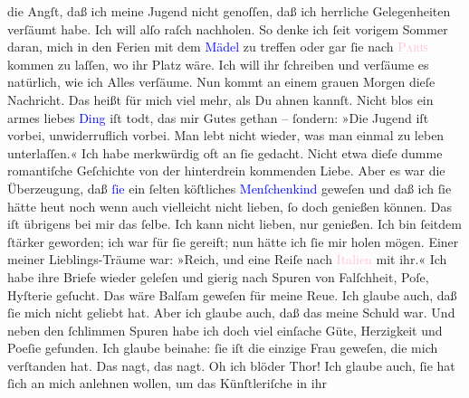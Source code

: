                die Angſt, daß ich \strikeout{\textcolor{gray}{d}} meine Jugend nicht genoſſen, daß ich herrliche Gelegenheiten verſäumt habe.
               Ich will alſo raſch nachholen. So denke ich ſeit vorigem Sommer daran, mich in den
               Ferien {\pb}mit dem \textcolor{blue}{Mädel}{} zu treffen oder gar ſie nach \textsc{\textcolor{pink}{Paris}{}\ledrightnote{\textcolor{pink}{Paris}}} kommen zu laſſen, wo ihr Platz wäre. Ich will ihr ſchreiben und verſäume es
               natürlich, wie ich Alles verſäume. Nun kommt an einem grauen Morgen dieſe Nachricht.
               Das heißt für mich viel mehr, als Du ahnen kannſt. Nicht blos ein armes liebes \textcolor{blue}{Ding}{} iſt todt, das mir Gutes
               gethan – ſondern: »Die Jugend iſt vorbei, unwiderruflich vorbei. Man lebt nicht
               wieder, was man einmal zu leben unterlaſſen.«\pend
           \pstart
           Ich habe merkwürdig oft an ſie gedacht. Nicht etwa dieſe dumme romantiſche Geſchichte
               von der hinterdrein kommenden Liebe. Aber  es war
               die Überzeugung, daß \textcolor{blue}{ſie}{} ein
               ſelten köſtliches \textcolor{blue}{Menſchenkind}{} geweſen {\pb}und daß ich ſie hätte
                  heut noch wenn auch vielleicht nicht lieben, ſo
               doch genießen können. Das iſt übrigens bei mir das ſelbe. Ich kann nicht lieben, nur
               genießen. Ich bin ſeitdem ſtärker geworden; ich war für ſie gereift; nun hätte ich
               ſie mir holen mögen. Einer meiner Lieblings-Träume war: »Reich, und eine Reiſe nach
                  \textcolor{pink}{Italien}{}\ledrightnote{\textcolor{pink}{Italien}} mit ihr.«\pend
           \pstart
           Ich habe ihre Briefe wieder geleſen und gierig nach Spuren von Falſchheit, Poſe,
               Hyſterie geſucht. Das wäre Balſam geweſen für meine Reue. Ich glaube auch, daß ſie
               mich nicht geliebt hat. Aber ich glaube auch, daß das meine Schuld war. Und neben den
                  {\pb}ſchlimmen Spuren habe ich doch viel einſache
               Güte, Herzigkeit und Poeſie gefunden. Ich glaube beinahe: ſie iſt die einzige Frau
               geweſen, die mich \strikeout{\textcolor{gray}{ver}} verſtanden hat. Das nagt, das nagt. Oh ich blöder Thor!\pend
           \pstart
           Ich glaube auch, ſie hat ſich an mich anlehnen wollen, um das Künſtleriſche in ihr
